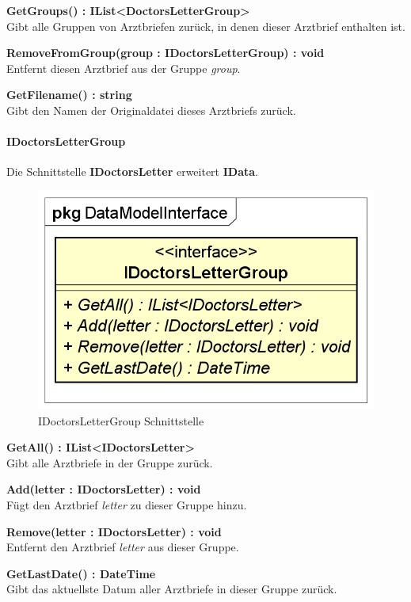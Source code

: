 \documentclass[a4paper]{scrreprt}
\begin{document}
\textbf{GetGroups() : IList<DoctorsLetterGroup>}\\
Gibt alle Gruppen von Arztbriefen zurück, in denen dieser Arztbrief enthalten ist.

\textbf{RemoveFromGroup(group : IDoctorsLetterGroup) : void}\\
Entfernt diesen Arztbrief aus der Gruppe \textit{group}.

\textbf{GetFilename() : string}\\
Gibt den Namen der Originaldatei dieses Arztbriefs zurück.

\paragraph{IDoctorsLetterGroup}
Die Schnittstelle \textbf{IDoctorsLetter} erweitert \textbf{IData}.

\begin{figure}[H]
\centering
\includegraphics[width=0.75\textheight]{graphics/Klassendiagramme/Model/IDoctorsLetterGroup.png}
\caption{IDoctorsLetterGroup Schnittstelle}
\end{figure}
\textbf{GetAll() : IList<IDoctorsLetter>}\\
Gibt alle Arztbriefe in der Gruppe zurück.

\textbf{Add(letter : IDoctorsLetter) : void}\\
Fügt den Arztbrief \textit{letter} zu dieser Gruppe hinzu.

\textbf{Remove(letter : IDoctorsLetter) : void}\\
Entfernt den Arztbrief \textit{letter} aus dieser Gruppe.

\textbf{GetLastDate() : DateTime}\\
Gibt das aktuellste Datum aller Arztbriefe in dieser Gruppe zurück.
\end{document}
